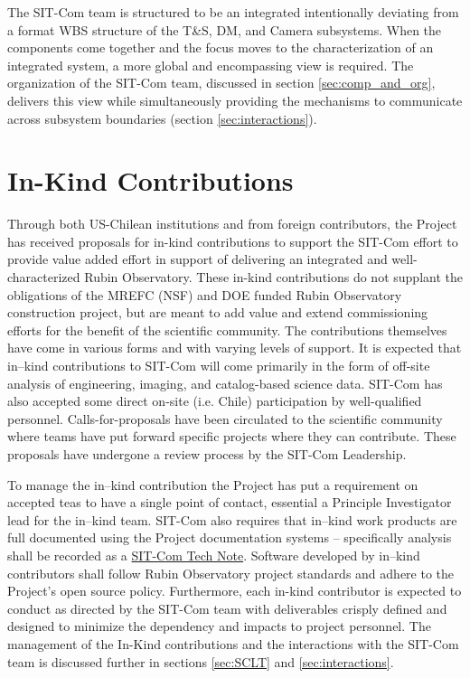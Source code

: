 \documentclass[SE,lsstdraft,authoryear,toc]{lsstdoc}
\begin{document}
The SIT-Com team is structured to be an integrated intentionally deviating from a format WBS structure of the T\&S, DM, and Camera subsystems.
When the components come together and the focus moves to the characterization of an integrated system, a more global and encompassing view is required.
The organization of the SIT-Com team, discussed in section \ref{sec:comp_and_org}, delivers this view while simultaneously providing the mechanisms to communicate across subsystem boundaries (section \ref{sec:interactions}).

\section{In-Kind Contributions}
\label{sec:in_kind}

Through both US-Chilean institutions and from foreign contributors, the Project has received proposals for in-kind contributions to support the SIT-Com effort to provide value added effort in support of delivering an integrated and well-characterized Rubin Observatory.
These in-kind contributions do not supplant the obligations of the MREFC (NSF) and DOE funded Rubin Observatory construction project, but are meant to add value and extend commissioning efforts for the benefit of the scientific community.
The contributions themselves have come in various forms and with varying levels of support.
It is expected that in--kind contributions to SIT-Com will come primarily in the form of off-site analysis of engineering, imaging, and catalog-based science data.
SIT-Com has also accepted some direct on-site (i.e. Chile) participation by well-qualified personnel.
Calls-for-proposals have been circulated to the scientific community where teams have put forward specific projects where they can contribute.
These proposals have undergone a review process by the SIT-Com Leadership.

To manage the in--kind contribution the Project has put a requirement on accepted teas to have a single point of contact, essential a Principle Investigator lead for the in--kind team.
SIT-Com also requires that in--kind work products are full documented using the Project documentation systems -- specifically analysis shall be recorded as a \href{https://www.lsst.io/sitcomtn/?}{SIT-Com Tech Note}.
Software developed by in--kind contributors shall follow Rubin Observatory project standards and adhere to the Project's open source policy.
Furthermore, each in-kind contributor is expected to conduct as directed by the SIT-Com team with deliverables crisply defined and designed to minimize the dependency and impacts to project personnel.
The management of the In-Kind contributions and the interactions with the SIT-Com team is discussed further in sections \ref{sec:SCLT} and \ref{sec:interactions}.
\end{document}

